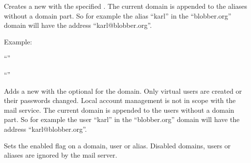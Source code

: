 Creates a new  with the specified . 
The current domain is appended
to the aliases without a domain part. So for example the alias ``karl''
in the ``blobber.org'' domain will have the address ``karl@blobber.org''.

Example:

\begin{compactitem}
\item ``''
\item ``''
\end{compactitem}


Adds a new  with the optional  for the domain.
Only virtual users are created or their passwords changed.
Local account management is not in scope with the mail service.
The current domain is appended to the users without a domain part. 
So for example the user ``karl'' in the ``blobber.org'' domain will 
have the address ``karl@blobber.org''.


Sets the enabled flag on a domain, user or alias. Disabled domains, users or
aliases are ignored by the mail server.

